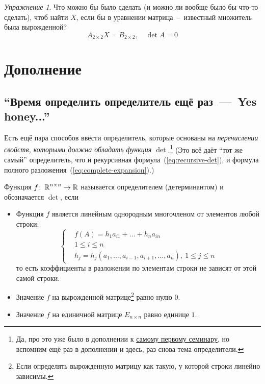 \documentclass[a4paper,12pt]{article}
\theoremstyle{remark}
\newtheorem*{exercise}{Упражнение}
\begin{document}
\begin{solution}
    \begin{exercise}
      Что можно бы было сделать (и можно ли вообще было бы что-то сделать), чтоб найти $X$, если бы в уравнении матрица~--~известный множитель была вырожденной?
      \[
        A_{2 \times 2} X = B_{2 \times 2},\quad \det A = 0
      \]
    \end{exercise}
  \end{solution}


  \newpage
  
  \section{Дополнение}
  
  \subsection{``Время определить определитель ещё раз~---~Yes honey...''}
  
  Есть ещё пара способов ввести определитель, которые основаны на \emph{перечислении свойств, которыми должна обладать функция $\det$}.\footnote{Да, про это уже было в дополнении к \href{https://github.com/Alvant/GeomeSeminare/tree/master2022/seminars/geome/seminar01}{самому первому семинару}, но вспомним ещё раз в дополнении и здесь, раз снова тема определители.}
  (Это всё даёт ``тот же самый'' определитель, что и рекурсивная формула~(\ref{eq:recursive-det}), и формула полного разложения~(\ref{eq:complete-expansion}).)
  
  \begin{definition}
    Функция $f \colon \operatorname{\mathbb R}^{n \times n} \to \operatorname{\mathbb R}$ называется определителем (детерминантом) и обозначается $\det$, если
    \begin{itemize}
      \item Функция $f$ является линейным однородным многочленом от элементов любой строки:
      \[
        \left\{
          \begin{aligned}
            &f(A) = h_1 a_{i1} + \ldots + h_n a_{in}\\
            &1 \leq i \leq n\\
            &h_j = h_j(a_1, \ldots, a_{i-1}, a_{i+1}, \ldots, a_{n}),\ 1 \leq j \leq n
          \end{aligned}
        \right.
      \]
      то есть коэффициенты в разложении по элементам строки не зависят от этой самой строки.
      
      \item Значение $f$ на вырожденной матрице\footnote{Если определять вырожденную матрицу как такую, у которой строки линейно зависимы.} равно нулю $0$.
      \item Значение $f$ на единичной матрице $E_{n \times n}$ равно единице $1$.
    \end{itemize}
  \end{definition}
  
\end{document}
